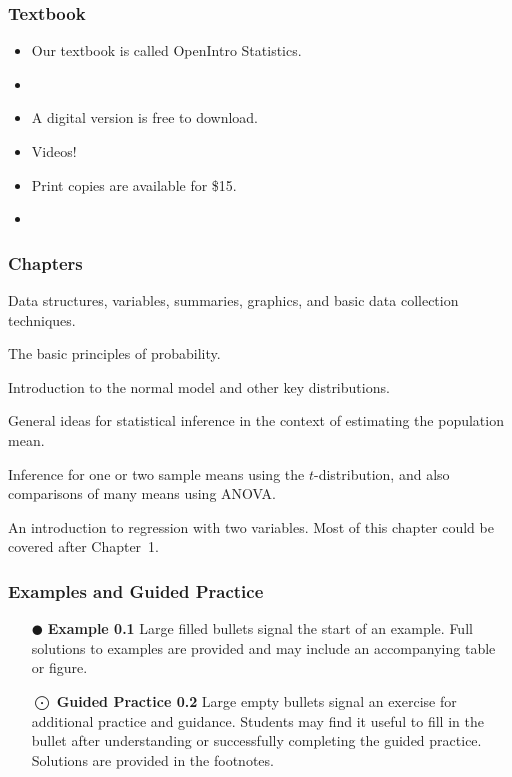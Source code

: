 \begin{frame}
\frametitle{Textbook}
\begin{itemize}
\item Our textbook is called OpenIntro Statistics. 
\item {}
\item A digital version is free to download.
\item Videos!
\item Print copies are available for \$15.
\item {}
\end{itemize}
\end{frame}

\begin{frame}
\frametitle{Chapters}
\begin{description}
\setlength{\itemsep}{0mm}
\item[1. Introduction to data.] Data structures, variables, summaries, graphics, and basic data collection techniques.
\item[2. Probability.] The basic principles of probability.
\item[3. Distributions of random variables.] Introduction to the normal model and other key distributions.
\item[4. Foundations for inference.] General ideas for statistical inference in the context of estimating the population mean.
\item[5. Inference for numerical data.] \hspace{1mm}Inference for one or two sample means using the \mbox{$t$-distribution}, and also comparisons of many means using ANOVA.
\item[7. Introduction to linear regression.] An introduction to regression with two variables. Most of this chapter could be covered after Chapter~1.
\end{description}
\end{frame}

\begin{frame}
\frametitle{Examples and Guided Practice}
\begin{itemize}
\item[\color{oiB}\Large$\CIRCLE$]\noindent\textbf{\color{oiB}Example 0.1}\hspace{0.3cm}
Large filled bullets signal the start of an example. Full solutions to examples are provided and may include an accompanying table or figure.
\item[\color{oiB}$\bigodot$]\noindent\textbf{\color{oiB}Guided Practice 0.2}\hspace{0.3cm}
Large empty bullets signal an exercise for additional practice and guidance. Students may find it useful to fill in the bullet after understanding or successfully completing the guided practice. Solutions are provided in the footnotes.
\end{itemize}
\end{frame}


